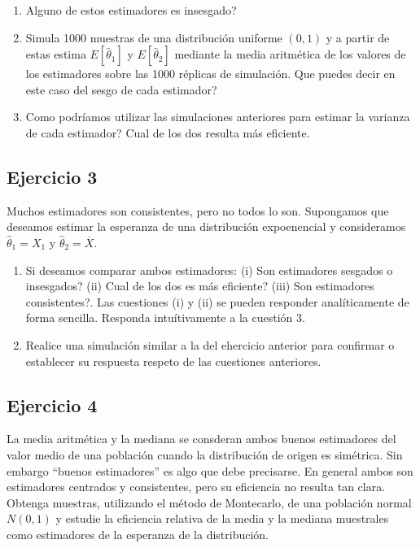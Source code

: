 \documentclass[
]{article}
\providecommand{\tightlist}{%
  \setlength{\itemsep}{0pt}\setlength{\parskip}{0pt}}
\begin{document}
\begin{enumerate}
\def\labelenumi{\alph{enumi}.}
\tightlist
\item
  Alguno de estos estimadores es insesgado?
\item
  Simula 1000 muestras de una distribución uniforme \((0,1)\) y a partir de estas estima \(E[\hat \theta_1]\) y \(E[\hat \theta_2 ]\) mediante la media aritmética de los valores de los estimadores sobre las 1000 réplicas de simulación. Que puedes decir en este caso del sesgo de cada estimador?
\item
  Como podríamos utilizar las simulaciones anteriores para estimar la varianza de cada estimador? Cual de los dos resulta más eficiente.
\end{enumerate}

\subsection{Ejercicio 3}\label{ejercicio-3-2}

Muchos estimadores son consistentes, pero no todos lo son. Supongamos que deseamos estimar la esperanza de una distribución expoenencial y consideramos \(\hat \theta_1 = X_1\) y \(\hat\theta_2=\overline{X}\).

\begin{enumerate}
\def\labelenumi{\alph{enumi}.}
\tightlist
\item
  Si deseamos comparar ambos estimadores: (i) Son estimadores sesgados o insesgados? (ii) Cual de los dos es más eficiente? (iii) Son estimadores consistentes?. Las cuestiones (i) y (ii) se pueden responder analíticamente de forma sencilla. Responda intuítivamente a la cuestión 3.
\item
  Realice una simulación similar a la del ehercicio anterior para confirmar o establecer su respuesta respeto de las cuestiones anteriores.
\end{enumerate}

\subsection{Ejercicio 4}\label{ejercicio-4-2}

La media aritmética y la mediana se consderan ambos buenos estimadores del valor medio de una población cuando la distribución de origen es simétrica. Sin embargo ``buenos estimadores'' es algo que debe precisarse. En general ambos son estimadores centrados y consistentes, pero su eficiencia no resulta tan clara.
Obtenga muestras, utilizando el método de Montecarlo, de una población normal \(N(0,1)\) y estudie la eficiencia relativa de la media y la mediana muestrales como estimadores de la esperanza de la distribución.
\end{document}
